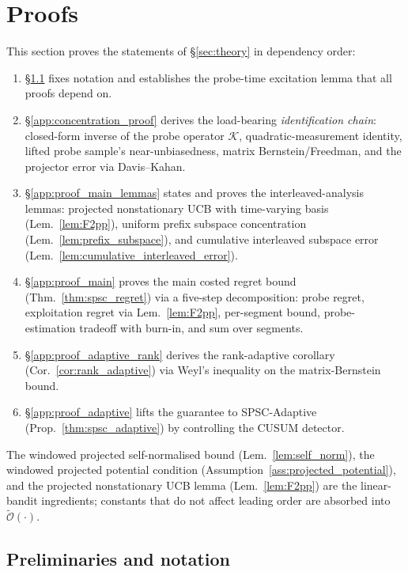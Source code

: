 \documentclass{article}
\newcommand{\tilO}{\widetilde{\mathcal{O}}}
\begin{document}
\section{Proofs}
\label{app:proofs}

This section proves the statements of \S\ref{sec:theory} in
dependency order:
\begin{enumerate}[leftmargin=*,itemsep=1pt,topsep=2pt]
  \item \S\ref{app:prelim} fixes notation and establishes the
    probe-time excitation lemma that all proofs depend on.
  \item \S\ref{app:concentration_proof} derives the load-bearing
    \emph{identification chain}: closed-form inverse of the probe
    operator $\mathcal K$, quadratic-measurement identity, lifted
    probe sample's near-unbiasedness, matrix Bernstein/Freedman, and
    the projector error via Davis--Kahan.
  \item \S\ref{app:proof_main_lemmas} states and proves the
    interleaved-analysis lemmas: projected nonstationary UCB with
    time-varying basis (Lem.~\ref{lem:F2pp}), uniform prefix
    subspace concentration (Lem.~\ref{lem:prefix_subspace}), and
    cumulative interleaved subspace error
    (Lem.~\ref{lem:cumulative_interleaved_error}).
  \item \S\ref{app:proof_main} proves the main costed regret bound
    (Thm.~\ref{thm:spsc_regret}) via a five-step decomposition:
    probe regret, exploitation regret via Lem.~\ref{lem:F2pp},
    per-segment bound, probe-estimation tradeoff with burn-in, and
    sum over segments.
  \item \S\ref{app:proof_adaptive_rank} derives the rank-adaptive
    corollary (Cor.~\ref{cor:rank_adaptive}) via Weyl's inequality on
    the matrix-Bernstein bound.
  \item \S\ref{app:proof_adaptive} lifts the guarantee to
    SPSC-Adaptive (Prop.~\ref{thm:spsc_adaptive}) by controlling the
    CUSUM detector.
\end{enumerate}
The windowed projected self-normalised bound
(Lem.~\ref{lem:self_norm}), the windowed projected potential
condition (Assumption~\ref{ass:projected_potential}), and the
projected nonstationary UCB lemma (Lem.~\ref{lem:F2pp}) are the
linear-bandit ingredients; constants that do not affect leading
order are absorbed into $\tilO(\cdot)$.

\subsection{Preliminaries and notation}
\label{app:prelim}
\end{document}
